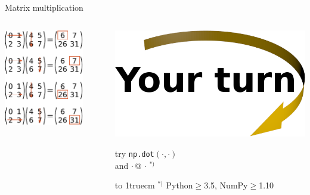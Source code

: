 \documentclass[svgnames]{beamer}
\begin{document}
\begin{frame}[fragile]{Matrix multiplication}
 \begin{columns}
  \begin{column}{0.6\textwidth}
   \begin{center}
    \includegraphics[width=0.8\textwidth]{matrixmult}
   \end{center}
  \end{column}%
  \begin{column}{0.4\textwidth}
   \includegraphics[width=3truecm]{yourturn}

   \vspace{0.4truecm}
   try \texttt{np.dot$(\cdot, \cdot)$}\\
   and \texttt{$\cdot\,@\,\cdot$}\,$^{*)}$
   
   \vspace{0.7truecm}
   \hbox to 1truecm{\hrulefill}
   \scriptsize{$^{*)}$ Python$\geq$3.5, NumPy$\geq$1.10}
   \vspace{1truecm}
  \end{column}
 \end{columns}
\end{frame}
\end{document}
